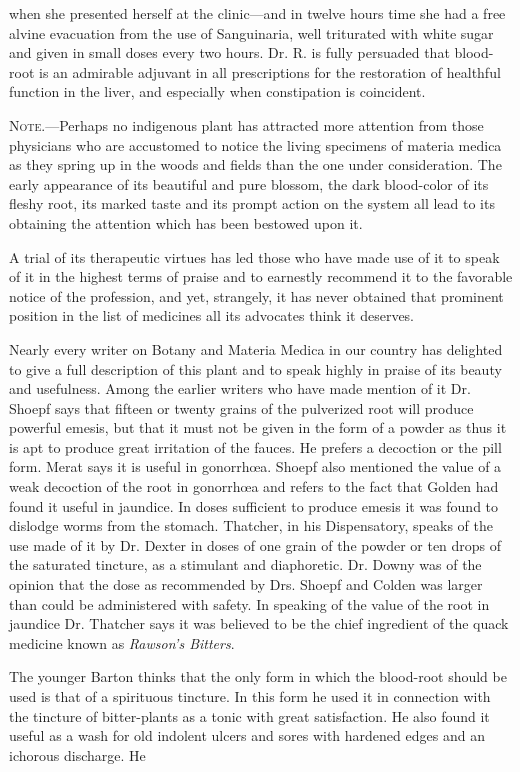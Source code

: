when she presented herself at the clinic—and in twelve hours time
she had a free alvine evacuation from the use of Sanguinaria, well triturated
with white sugar and given in small doses every two hours.
Dr. R. is fully persuaded that blood-root is an admirable adjuvant in
all prescriptions for the restoration of healthful function in the liver,
and especially when constipation is coincident.

\textsc{Note}.---Perhaps no indigenous plant has attracted more attention
from those physicians who are accustomed to notice the living specimens
of materia medica as they spring up in the woods and fields
than the one under consideration. The early appearance of its beautiful
and pure blossom, the dark blood-color of its fleshy root, its marked
taste and its prompt action on the system all lead to its obtaining the
attention which has been bestowed upon it.

A trial of its therapeutic virtues has led those who have made use of
it to speak of it in the highest terms of praise and to earnestly recommend
it to the favorable notice of the profession, and yet, strangely, it
has never obtained that prominent position in the list of medicines all
its advocates think it deserves.

Nearly every writer on Botany and Materia Medica in our country
has delighted to give a full description of this plant and to speak highly
in praise of its beauty and usefulness. Among the earlier writers who
have made mention of it Dr. Shoepf says that fifteen or twenty grains
of the pulverized root will produce powerful emesis, but that it must not be
given in the form of a powder as thus it is apt to produce great irritation
of the fauces. He prefers a decoction or the pill form. Merat says it
is useful in gonorrhœa. Shoepf also mentioned the value of a weak
decoction of the root in gonorrhœa and refers to the fact that Golden
had found it useful in jaundice. In doses sufficient to produce emesis
it was found to dislodge worms from the stomach. Thatcher, in his
Dispensatory, speaks of the use made of it by Dr. Dexter in doses of
one grain of the powder or ten drops of the saturated tincture, as a
stimulant and diaphoretic. Dr. Downy was of the opinion that the
dose as recommended by Drs. Shoepf and Colden was larger than could
be administered with safety. In speaking of the value of the root in
jaundice Dr. Thatcher says it was believed to be the chief ingredient
of the quack medicine known as \emph{Rawson's Bitters}.

The younger Barton thinks that the only form in which the blood-root
should be used is that of a spirituous tincture. In this form he
used it in connection with the tincture of bitter-plants as a tonic with
great satisfaction. He also found it useful as a wash for old indolent
ulcers and sores with hardened edges and an ichorous discharge. He\endinput